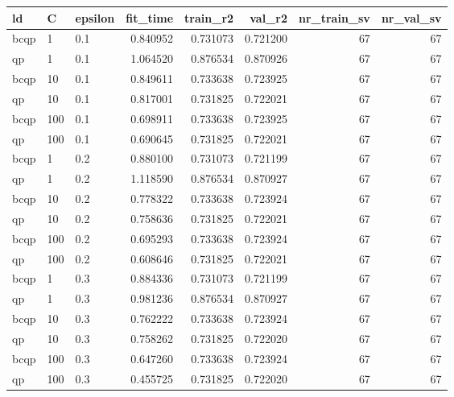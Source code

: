 \begin{tabular}{lllrrrrr}
\toprule
  ld &   C & epsilon &  fit\_time &  train\_r2 &   val\_r2 &  nr\_train\_sv &  nr\_val\_sv \\
\midrule
bcqp &   1 &     0.1 &  0.840952 &  0.731073 & 0.721200 &           67 &         67 \\
  qp &   1 &     0.1 &  1.064520 &  0.876534 & 0.870926 &           67 &         67 \\
bcqp &  10 &     0.1 &  0.849611 &  0.733638 & 0.723925 &           67 &         67 \\
  qp &  10 &     0.1 &  0.817001 &  0.731825 & 0.722021 &           67 &         67 \\
bcqp & 100 &     0.1 &  0.698911 &  0.733638 & 0.723925 &           67 &         67 \\
  qp & 100 &     0.1 &  0.690645 &  0.731825 & 0.722021 &           67 &         67 \\
bcqp &   1 &     0.2 &  0.880100 &  0.731073 & 0.721199 &           67 &         67 \\
  qp &   1 &     0.2 &  1.118590 &  0.876534 & 0.870927 &           67 &         67 \\
bcqp &  10 &     0.2 &  0.778322 &  0.733638 & 0.723924 &           67 &         67 \\
  qp &  10 &     0.2 &  0.758636 &  0.731825 & 0.722021 &           67 &         67 \\
bcqp & 100 &     0.2 &  0.695293 &  0.733638 & 0.723924 &           67 &         67 \\
  qp & 100 &     0.2 &  0.608646 &  0.731825 & 0.722021 &           67 &         67 \\
bcqp &   1 &     0.3 &  0.884336 &  0.731073 & 0.721199 &           67 &         67 \\
  qp &   1 &     0.3 &  0.981236 &  0.876534 & 0.870927 &           67 &         67 \\
bcqp &  10 &     0.3 &  0.762222 &  0.733638 & 0.723924 &           67 &         67 \\
  qp &  10 &     0.3 &  0.758262 &  0.731825 & 0.722020 &           67 &         67 \\
bcqp & 100 &     0.3 &  0.647260 &  0.733638 & 0.723924 &           67 &         67 \\
  qp & 100 &     0.3 &  0.455725 &  0.731825 & 0.722020 &           67 &         67 \\
\bottomrule
\end{tabular}
